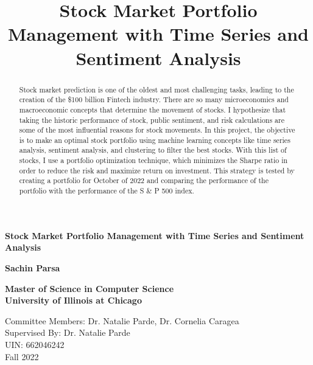 \documentclass[12pt,a4paper, twoside]{article}
\title{Stock Market Portfolio
Management with Time Series and
Sentiment Analysis\vspace{-2em}}
\begin{document}
\begin{titlepage}
    \begin{center}
        \vspace*{1cm}
            
        \huge
        \textbf{Stock Market Portfolio Management with Time Series and Sentiment Analysis}
            
        \vspace{0.5cm}
            
        \vspace{1.5cm}

        \LARGE
        \textbf{Sachin Parsa}
            
        \vfill
        \LARGE
        \textbf{Master of Science in Computer Science\\
        University of Illinois at Chicago\\}
            
        \vspace{0.8cm}
            
            
        \Large
        Committee Members: Dr. Natalie Parde, Dr. Cornelia Caragea\\
        Supervised By: Dr. Natalie Parde\\
        UIN: 662046242\\
        Fall 2022
            
    \end{center}
\end{titlepage}
\pagestyle{fancy}
\fancyhead{}
\fancyhead[RE, LO]{\thepage}
\fancyfoot{} %
\tableofcontents
\newpage
{}
\maketitle
\begin{abstract}
    \indent
    Stock market prediction is one of the oldest and most challenging tasks, leading to the creation of the \$100 billion Fintech industry. There are so many microeconomics and macroeconomic concepts that determine the movement of stocks. I hypothesize that taking the historic performance of stock, public sentiment, and risk calculations are some of the most influential reasons for stock movements. In this project, the objective is to make an optimal stock portfolio using machine learning concepts like time series analysis, sentiment analysis, and clustering to filter the best stocks. With this list of stocks, I use a portfolio optimization technique, which minimizes the Sharpe ratio in order to reduce the risk and maximize return on investment. This strategy is tested by creating a portfolio for October of 2022 and comparing the performance of the portfolio with the performance of the S \& P 500 index.
\end{abstract}
\end{document}
